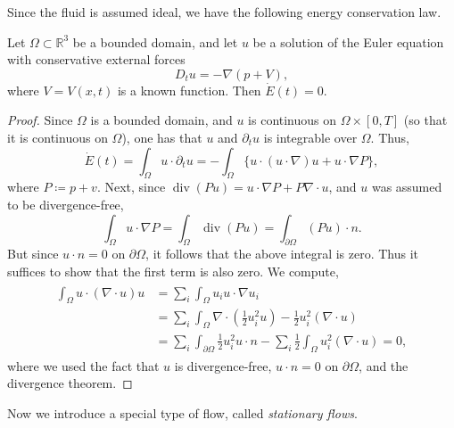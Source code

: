 \documentclass{article}
\begin{document}
Since the fluid is assumed ideal, we have the following energy conservation law. 

\begin{theorem}
	Let $\Omega \subset \mathbb{R}^{3}$ be a bounded domain, and let $u$ be a solution of the Euler equation with conservative external forces 
	\begin{equation*}
		D_{t}u = -\nabla (p + V), 
	\end{equation*}
	where $V = V(x, t)$ is a known function. Then $\dot{E}(t) =0$. 
\end{theorem} 
\begin{proof}
	Since $\Omega$ is a bounded domain, and $u$ is continuous on $\Omega \times [0,T]$ (so that it is continuous on $\Omega$), one has that $u$ and $\partial_{t}u$ is integrable over $\Omega$. Thus, 
	\begin{equation*}
		\dot{E}(t) = \int_{\Omega} u \cdot \partial_{t}u = -\int_{\Omega}\{u \cdot (u \cdot \nabla)u + u \cdot \nabla P\}, 
	\end{equation*} 
	where $P \coloneqq p + v$. Next, since $\operatorname{div}(Pu) = u \cdot \nabla P + P \nabla \cdot u$, and $u$ was assumed to be divergence-free, 
	\begin{equation*}
		\int_{\Omega}u \cdot \nabla P = \int_{\Omega}\operatorname{div}(Pu) = \int_{\partial \Omega}(Pu) \cdot n. 
	\end{equation*} 
	But since $u \cdot n = 0$ on $\partial \Omega$, it follows that the above integral is zero. Thus it suffices to show that the first term is also zero. We compute, 
	\begin{align*}
		\begin{split} 
			\int_{\Omega}u \cdot (\nabla \cdot u)u &= \sum_{i}\int_{\Omega}u_{i}u\cdot \nabla u_{i} \\
			&= \sum_{i}\int_{\Omega}\nabla \cdot \left(\frac{1}{2}u_{i}^{2}u\right) - \frac{1}{2}u_{i}^{2}(\nabla \cdot u) \\
			&= \sum_{i} \int_{\partial \Omega} \frac{1}{2}u_{i}^{2}u \cdot n - \sum_{i} \frac{1}{2}\int_{\Omega} u_{i}^{2}(\nabla \cdot u) = 0, 
		\end{split} 
	\end{align*} 
	where we used the fact that $u$ is divergence-free, $u \cdot n = 0$ on $\partial \Omega$, and the divergence theorem. 
\end{proof} 

Now we introduce a special type of flow, called \textit{stationary flows}. 
\end{document}
